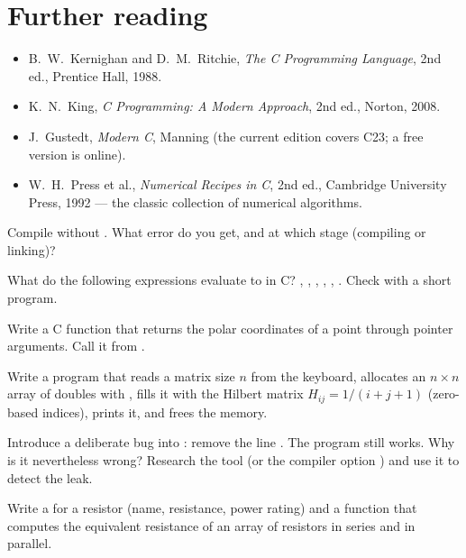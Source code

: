 \section{Further reading}
\begin{itemize}
\item B.~W.~Kernighan and D.~M.~Ritchie, \emph{The C Programming Language}, 2nd ed.,
  Prentice Hall, 1988.
\item K.~N.~King, \emph{C Programming: A Modern Approach}, 2nd ed., Norton, 2008.
\item J.~Gustedt, \emph{Modern C}, Manning (the current edition covers C23; a free version is online).
\item W.~H.~Press et al., \emph{Numerical Recipes in C}, 2nd ed., Cambridge University
  Press, 1992 --- the classic collection of numerical algorithms.
\end{itemize}

\begin{exercises}
\item Compile  without . What error do you get, and at which stage
  (compiling or linking)?
\item What do the following expressions evaluate to in C? , ,
  , , , . Check with a short program.
\item Write a C function 
  that returns the polar coordinates of a point through pointer arguments. Call it from
  .
\item Write a program that reads a matrix size $n$ from the keyboard, allocates an
  $n\times n$ array of doubles with , fills it with the Hilbert matrix
  $H_{ij} = 1/(i+j+1)$ (zero-based indices), prints it, and frees the memory.
\item Introduce a deliberate bug into : remove the line
  . The program still works. Why is it nevertheless wrong? Research the
  tool  (or the compiler option ) and use it to
  detect the leak.
\item Write a  for a resistor (name, resistance, power rating) and a function
  that computes the equivalent resistance of an array of resistors in series and in
  parallel.
\end{exercises}
